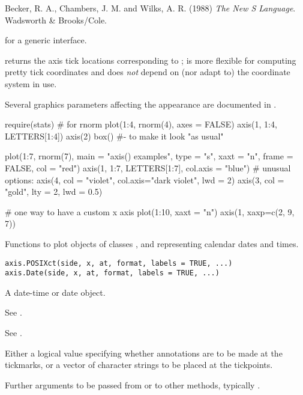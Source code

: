 %
\begin{References}\relax
Becker, R. A., Chambers, J. M. and Wilks, A. R. (1988)
\emph{The New S Language}.
Wadsworth \& Brooks/Cole.
\end{References}
%
\begin{SeeAlso}\relax
{} for a generic interface.

 returns the axis tick locations
corresponding to ;  is more flexible
for computing pretty tick coordinates and does \emph{not} depend on
(nor adapt to) the coordinate system in use.

Several graphics parameters affecting the appearance are documented
in .
\end{SeeAlso}
%
\begin{Examples}
\begin{ExampleCode}
require(stats) # for rnorm
plot(1:4, rnorm(4), axes = FALSE)
axis(1, 1:4, LETTERS[1:4])
axis(2)
box() #- to make it look "as usual"

plot(1:7, rnorm(7), main = "axis() examples",
     type = "s", xaxt = "n", frame = FALSE, col = "red")
axis(1, 1:7, LETTERS[1:7], col.axis = "blue")
# unusual options:
axis(4, col = "violet", col.axis="dark violet", lwd = 2)
axis(3, col = "gold", lty = 2, lwd = 0.5)

# one way to have a custom x axis
plot(1:10, xaxt = "n")
axis(1, xaxp=c(2, 9, 7))
\end{ExampleCode}
\end{Examples}
%
\begin{Description}\relax
Functions to plot objects of classes ,
 and  representing calendar dates and times. 
\end{Description}
%
\begin{Usage}
\begin{verbatim}
axis.POSIXct(side, x, at, format, labels = TRUE, ...)
axis.Date(side, x, at, format, labels = TRUE, ...)
\end{verbatim}
\end{Usage}
%
\begin{Arguments}
\begin{ldescription}
\item[\code{x, at}] A date-time or date object.
\item[\code{side}] See .
\item[\code{format}] See .
\item[\code{labels}] Either a logical value specifying whether
annotations are to be made at the tickmarks, or a vector of character
strings to be placed at the tickpoints.
\item[\code{...}] Further arguments to be passed from or to other methods,
typically .
\end{ldescription}
\end{Arguments}
